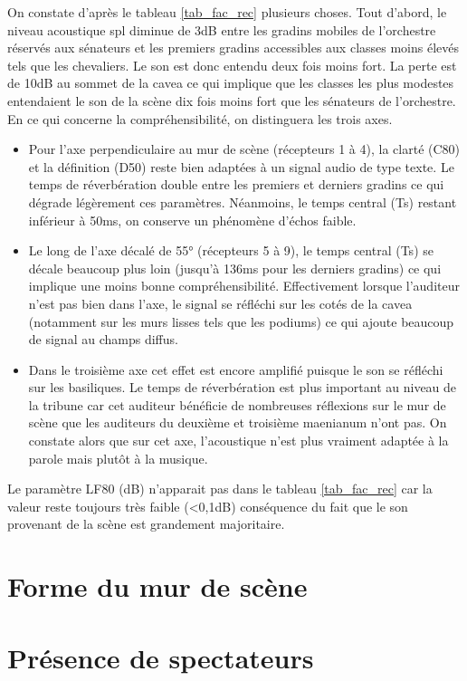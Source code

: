 On constate d'après le tableau \ref{tab_fac_rec} plusieurs choses. Tout d'abord, le niveau acoustique \gls{spl} diminue de 3dB entre les gradins mobiles de l'orchestre réservés aux sénateurs et les premiers gradins accessibles aux classes moins élevés tels que les chevaliers. Le son est donc entendu deux fois moins fort. La perte est de 10dB au sommet de la cavea ce qui implique que les classes les plus modestes entendaient le son de la scène dix fois moins fort que les sénateurs de l'orchestre. En ce qui concerne la compréhensibilité, on distinguera les trois axes.
\begin{itemize}
\item Pour l'axe perpendiculaire au mur de scène (récepteurs 1 à 4), la clarté (\gls{C80}) et la définition (\gls{D50}) reste bien adaptées à un signal audio de type texte. Le temps de réverbération double entre les premiers et derniers gradins ce qui dégrade légèrement ces paramètres. Néanmoins, le temps central (\gls{Ts}) restant inférieur à 50ms, on conserve un phénomène d'échos faible.
\item Le long de l'axe décalé de 55° (récepteurs 5 à 9), le temps central (\gls{Ts}) se décale beaucoup plus loin (jusqu'à 136ms pour les derniers gradins) ce qui implique une moins bonne compréhensibilité. Effectivement lorsque l'auditeur n'est pas bien dans l'axe, le signal se réfléchi sur les cotés de la \gls{cavea} (notamment sur les murs lisses tels que les \glspl{podium}) ce qui ajoute beaucoup de signal au champs diffus.  
\item Dans le troisième axe cet effet est encore amplifié puisque le son se réfléchi sur les \glspl{basilique}. Le temps de réverbération est plus important au niveau de la tribune car cet auditeur bénéficie de nombreuses réflexions sur le mur de scène que les auditeurs du deuxième et troisième \gls{maenianum} n'ont pas. On constate alors que sur cet axe, l'acoustique n'est plus vraiment adaptée à la parole mais plutôt à la musique.
\end{itemize}
Le paramètre \gls{LF80} (dB) n'apparait pas dans le tableau \ref{tab_fac_rec} car la valeur reste toujours très faible (<0,1dB) conséquence du fait que le son provenant de la scène est grandement majoritaire.

\section{Forme du mur de scène}	
\section{Présence de spectateurs}
\cite[p.212]{jouhaneau}
